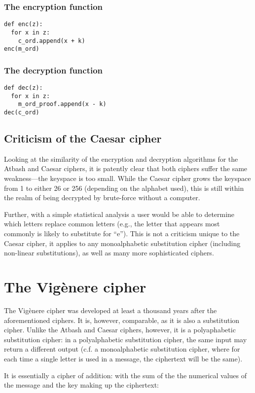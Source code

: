 \documentclass{AIAA}
\begin{document}
\subsubsection{The encryption function}
\begin{verbatim}
def enc(z):
  for x in z:
    c_ord.append(x + k)
enc(m_ord)
\end{verbatim}

\subsubsection{The decryption function}
\begin{verbatim}
def dec(z):
  for x in z:
    m_ord_proof.append(x - k)
dec(c_ord)
\end{verbatim}

\subsection{Criticism of the Caesar cipher}
Looking at the similarity of the encryption and decryption algorithms for the Atbash and Caesar ciphers, it is patently clear that both ciphers suffer the same weakness---the keyspace is too small. While the Caesar cipher grows the keyspace from 1 to either 26 or 256 (depending on the alphabet used), this is still within the realm of being decrypted by brute-force without a computer.

Further, with a simple statistical analysis a user would be able to determine which letters replace common letters (e.g., the letter that appears most commonly is likely to substitute for ``e''). This is not a criticism unique to the Caesar cipher, it applies to any monoalphabetic substitution cipher (including non-linear substitutions), as well as many more sophisticated ciphers.

\section{The Vig\`enere cipher}
The Vig\`enere cipher was developed at least a thousand years after the aforementioned ciphers. It is, however, comparable, as it is also a substitution cipher. Unlike the Atbash and Caesar ciphers, however, it is a polyaphabetic substitution cipher: in a polyalphabetic substitution cipher, the same input may return a different output (c.f. a monoalphabetic substitution cipher, where for each time a single letter is used in a message, the ciphertext will be the same).

It is essentially a cipher of addition: with the sum of the the numerical values of the message and the key making up the ciphertext:
\end{document}
